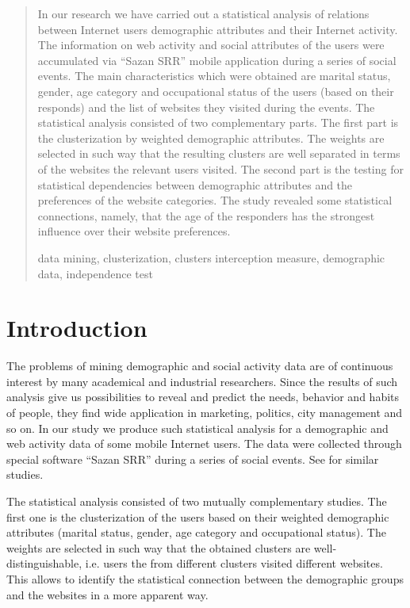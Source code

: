 \documentclass[runningheads,a4paper]{llncs}
\newcommand{\keywords}[1]{\par\addvspace\baselineskip
\noindent\keywordname\enspace\ignorespaces#1}
\begin{document}
\begin{abstract}
In our research we have carried out a statistical analysis of relations between Internet users demographic attributes and their Internet activity. The information on web activity and social attributes of the users were accumulated via ``Sazan SRR'' mobile application during a series of social events. The main characteristics which were obtained are marital status, gender, age category and occupational status of the users (based on their responds) and the list of websites they visited during the events. The statistical analysis consisted of two complementary parts. The first part is the clusterization by weighted demographic attributes. The weights are selected in such way that the resulting clusters are well separated in terms of the websites the relevant users visited. The second part is the testing for statistical dependencies between demographic attributes and the preferences of the website categories. The study revealed some statistical connections, namely, that the age of the responders has the strongest influence over their website preferences.


\keywords{data mining, clusterization, clusters interception measure, demographic data, independence test}
\end{abstract}


\section{Introduction}

The problems of mining demographic and social activity data are of continuous interest by many academical and industrial researchers. Since the results of such analysis give us possibilities to reveal and predict the needs, behavior and habits of people, they
find wide application in marketing, politics, city management and so on. In our study we produce such statistical analysis for a demographic and web activity data of some mobile Internet users. The data were collected through special software ``Sazan SRR'' during a series of social events. See \cite{sim-1,sim-2,sim-3,sim-4,sim-5} for similar studies.

The statistical analysis consisted of two mutually complementary studies. The first one is the clusterization of the users based on their weighted demographic attributes (marital status, gender, age category and occupational status). The weights are selected in such way that the obtained clusters are well-distinguishable, i.e. users the from different clusters visited different websites. This allows to identify the statistical connection between the demographic groups and the websites in a more apparent way.
\end{document}
